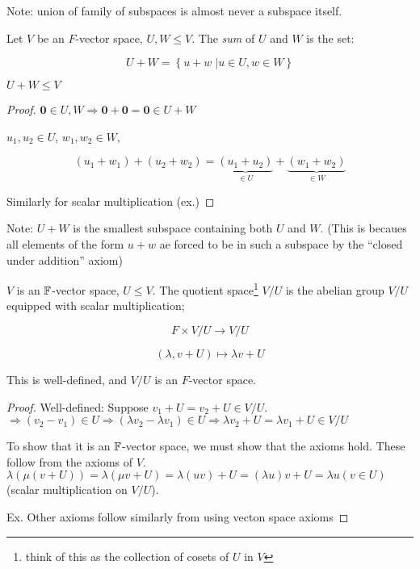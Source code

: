 \documentclass[a4paper]{article}
\begin{document}
Note: union of family of subspaces is almost never a subspace itself.


\begin{defi}
	Let $ V $ be an $ F $-vector space, $ U,W \leq V $. The \emph{sum} of $ U $ and $ W $ is the set:
	
	\[ U + W = \left\{  u + w \; | u \in U, w \in W    \right\}  \]
\end{defi}

\begin{prop} 
	$ U + W \leq V $
\end{prop}

\begin{proof}
	$ \mathbf{0} \in U,W \Rightarrow \mathbf{0} + \mathbf{0} = \mathbf{0} \in U + W $
	
	$ u_{1},u_{2} \in U $, $ w_{1},w_{2} \in W $, 
	
	\[ (u_{1} + w_{1}) + (u_{2} + w_{2}) = \underbrace{(u_{1} + u_{2})}_{\in U}  + \underbrace{(w_{1} + w_{2})}_{\in W} \]
	
	Similarly for scalar multiplication (ex.)
\end{proof}

Note: $ U + W $ is the smallest subspace containing both $ U $ and $ W $. (This is becaues all elements of the form $ u + w $ ae forced to be in such a subspace by the ``closed under addition'' axiom)


\begin{defi}
	$ V $ is an $ \mathbb{F} $-vector space, $ U \leq V $. The quotient space\footnote{think of this as the collection of cosets of $ U $ in $ V $ } $ V / U $ is the abelian group $ V / U $ equipped with scalar multiplication;
	
	\[ F \times V / U \to V / U \]
	
	\[ (\lambda, v + U) \mapsto \lambda v + U \]
\end{defi}

\begin{prop} 
	This is well-defined, and $ V/U $ is an $ F $-vector space.
\end{prop}

\begin{proof}
	Well-defined: Suppose $ v_{1} + U = v_{2} + U \in V / U $. $ \Rightarrow (v_{2} - v_{1}) \in U \Rightarrow ( \lambda v_{2} - \lambda v_{1}) \in U \Rightarrow \lambda v_{2} + U = \lambda v_{1} + U \in V / U $

To show that it is an $ \mathbb{F} $-vector space, we must show that the axioms hold. These follow from the axioms of $ V $.
$ \lambda ( \mu (v + U)) = \lambda ( \mu v + U) = \lambda(u v) + U = (\lambda u) v + U  = \lambda u (v \in U) $ (scalar multiplication on $ V / U $). 

Ex. Other axioms follow similarly from using vecton space axioms

\end{proof}
\end{document}
